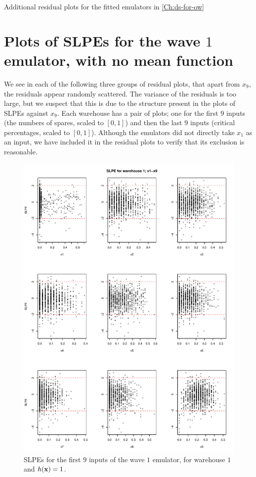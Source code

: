 \begin{chapter}{Additional residual plots  for the fitted emulators in \cref{Ch:ds-for-ow} \label{App:resid}}
\section{Plots of SLPEs for the wave $1$ emulator, with no mean function \label{App:resid1}}
We see in each of the following three groups of residual plots, that apart from $x_9$, the residuals appear randomly scattered. The variance of the residuals is too large, but we suspect that this is due to the structure present in the plots of SLPEs against $x_9$. Each warehouse has a pair of plots; one for the first $9$ inputs (the numbers of spares, scaled to $[0,1]$) and then the last $9$ inputs (critical percentages, scaled to $[0,1]$). Although the emulators did not directly take $x_1$ as an input, we have included it in the residual plots to verify that its exclusion is reasonable.
\begin{figure}
  \centering
  \includegraphics[width=\textwidth]{fig-app-ds/w1-w1-1.pdf}
  \caption{SLPEs for the first $9$ inputs of the wave $1$ emulator, for warehouse $1$ and $h(\mathbf{x}) = 1$.}
\end{figure}


\end{chapter}
